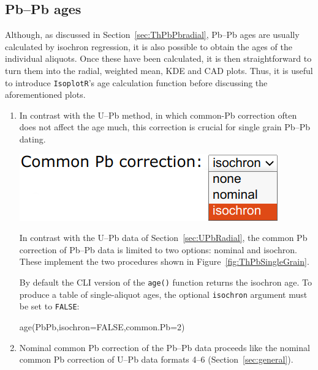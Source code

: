 \begin{refsection}
\section{Pb--Pb ages}\label{sec:PbPbAges}

Although, as discussed in Section~\ref{sec:ThPbPbradial}, Pb--Pb ages
are usually calculated by isochron regression, it is also possible to
obtain the ages of the individual aliquots. Once these have been
calculated, it is then straightforward to turn them into the radial,
weighted mean, KDE and CAD plots. Thus, it is useful to introduce
\texttt{IsoplotR}'s age calculation function before discussing the
aforementioned plots.

\begin{enumerate}

\item In contrast with the U--Pb method, in which common-Pb correction
  often does not affect the age much, this correction is crucial for
  single grain Pb--Pb dating.
  
\noindent\begin{minipage}[t]{.35\linewidth}
\strut\vspace*{-\baselineskip}\newline
\includegraphics[width=\linewidth]{../figures/PbPbRadialPb0.png}
\end{minipage}
\begin{minipage}[t]{.65\linewidth}
  In contrast with the U--Pb data of Section~\ref{sec:UPbRadial}, the
  common Pb correction of Pb--Pb data is limited to two options:
  nominal and isochron. These implement the two procedures shown in
  Figure~\ref{fig:ThPbSingleGrain}.
\end{minipage}

By default the CLI version of the \texttt{age()} function returns the
isochron age. To produce a table of single-aliquot ages, the optional
\texttt{isochron} argument must be set to \texttt{FALSE}:

\begin{console}
age(PbPb,isochron=FALSE,common.Pb=2)
\end{console}

\item Nominal common Pb correction of the Pb--Pb data proceeds like
  the nominal common Pb correction of U--Pb data formats 4--6
  (Section~\ref{sec:general}).


\end{enumerate}
\end{refsection}
